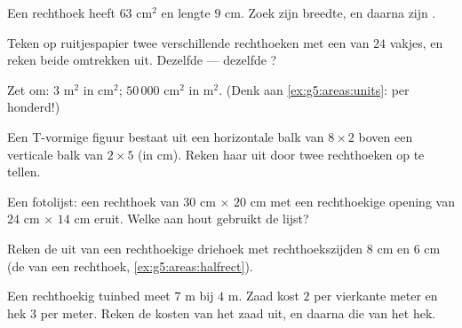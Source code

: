 \begin{exercise}[$\star$]\label{exo:g5:areas:3}
Een rechthoek heeft  $63$ cm$^2$ en lengte $9$ cm. Zoek zijn
breedte, en daarna zijn .
\end{exercise}

\begin{exercise}[$\star$]\label{exo:g5:areas:4}
Teken op ruitjespapier twee verschillende rechthoeken met een  van
$24$ vakjes, en reken beide omtrekken uit. Dezelfde  --- dezelfde
?
\end{exercise}

\begin{exercise}[$\star$]\label{exo:g5:areas:5}
Zet om: $3$ m$^2$ in cm$^2$; \quad $50\,000$ cm$^2$ in m$^2$. (Denk aan
\cref{ex:g5:areas:units}: per honderd!)
\end{exercise}

\begin{exercise}[$\star$]\label{exo:g5:areas:6}
Een T-vormige figuur bestaat uit een horizontale balk van $8 \times 2$ boven
een verticale balk van $2 \times 5$ (in cm). Reken haar  uit door
twee rechthoeken op te tellen.
\end{exercise}

\begin{exercise}[$\star$]\label{exo:g5:areas:7}
Een fotolijst: een rechthoek van $30$ cm $\times$ $20$ cm met een
rechthoekige opening van $24$ cm $\times$ $14$ cm eruit. Welke  aan
hout gebruikt de lijst?
\end{exercise}

\begin{exercise}[$\star$]\label{exo:g5:areas:8}
Reken de  uit van een rechthoekige driehoek met rechthoekszijden
$8$ cm en $6$ cm (de  van een rechthoek,
\cref{ex:g5:areas:halfrect}).
\end{exercise}

\begin{exercise}[$\star$]\label{exo:g5:areas:9}
Een rechthoekig tuinbed meet $7$ m bij $4$ m. Zaad kost $2$ per vierkante
meter en hek $3$ per meter. Reken de kosten van het zaad uit, en daarna die
van het hek.
\end{exercise}

